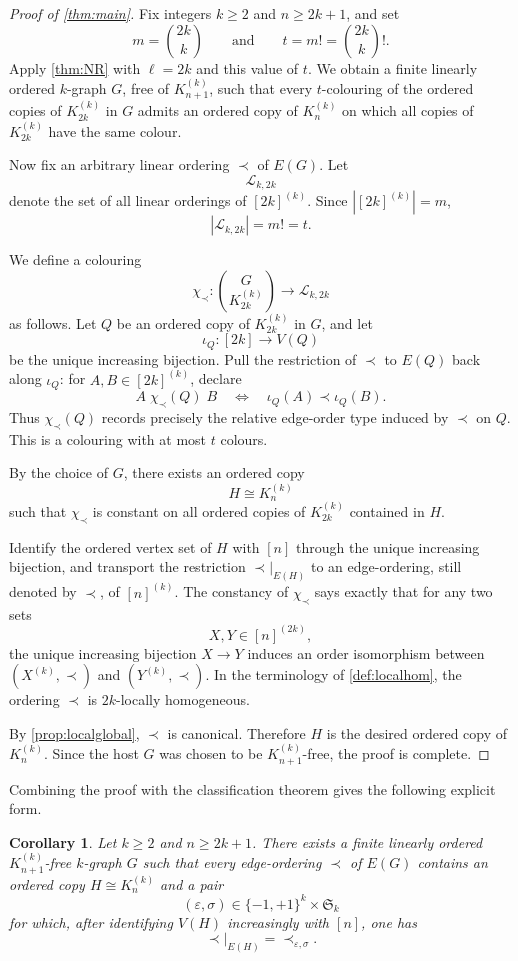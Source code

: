 \documentclass[11pt]{amsart}
\newtheorem{corollary}[theorem]{Corollary}
\theoremstyle{definition}
\newcommand{\eps}{\varepsilon}
\newcommand{\Sym}{\mathfrak{S}}
\begin{document}
\begin{proof}[Proof of \cref{thm:main}]
Fix integers $k\ge2$ and $n\ge2k+1$, and set
\[
m=\binom{2k}{k}
\qquad\text{and}\qquad
t=m!=\binom{2k}{k}!.
\]
Apply \cref{thm:NR} with $\ell=2k$ and this value of $t$. We obtain a finite linearly ordered $k$-graph $G$, free of $K_{n+1}^{(k)}$, such that every $t$-colouring of the ordered copies of $K_{2k}^{(k)}$ in $G$ admits an ordered copy of $K_n^{(k)}$ on which all copies of $K_{2k}^{(k)}$ have the same colour.

Now fix an arbitrary linear ordering $\prec$ of $E(G)$. Let
\[
\mathcal{L}_{k,2k}
\]
denote the set of all linear orderings of $[2k]^{(k)}$. Since $|[2k]^{(k)}|=m$,
\[
|\mathcal{L}_{k,2k}|=m!=t.
\]

We define a colouring
\[
\chi_{\prec}:\binom{G}{K_{2k}^{(k)}}\longrightarrow\mathcal{L}_{k,2k}
\]
as follows. Let $Q$ be an ordered copy of $K_{2k}^{(k)}$ in $G$, and let
\[
\iota_Q:[2k]\longrightarrow V(Q)
\]
be the unique increasing bijection. Pull the restriction of $\prec$ to $E(Q)$ back along $\iota_Q$: for $A,B\in[2k]^{(k)}$, declare
\[
A\;\chi_{\prec}(Q)\;B
\quad\Longleftrightarrow\quad
\iota_Q(A)\prec\iota_Q(B).
\]
Thus $\chi_{\prec}(Q)$ records precisely the relative edge-order type induced by $\prec$ on $Q$. This is a colouring with at most $t$ colours.

By the choice of $G$, there exists an ordered copy
\[
H\cong K_n^{(k)}
\]
such that $\chi_{\prec}$ is constant on all ordered copies of $K_{2k}^{(k)}$ contained in $H$.

Identify the ordered vertex set of $H$ with $[n]$ through the unique increasing bijection, and transport the restriction $\prec|_{E(H)}$ to an edge-ordering, still denoted by $\prec$, of $[n]^{(k)}$. The constancy of $\chi_{\prec}$ says exactly that for any two sets
\[
X,Y\in[n]^{(2k)},
\]
the unique increasing bijection $X\to Y$ induces an order isomorphism between $(X^{(k)},\prec)$ and $(Y^{(k)},\prec)$. In the terminology of \cref{def:localhom}, the ordering $\prec$ is $2k$-locally homogeneous.

By \cref{prop:localglobal}, $\prec$ is canonical. Therefore $H$ is the desired ordered copy of $K_n^{(k)}$. Since the host $G$ was chosen to be $K_{n+1}^{(k)}$-free, the proof is complete.
\end{proof}

Combining the proof with the classification theorem gives the following explicit form.

\begin{corollary}\label{cor:explicit}
Let $k\ge2$ and $n\ge2k+1$. There exists a finite linearly ordered $K_{n+1}^{(k)}$-free $k$-graph $G$ such that every edge-ordering $\prec$ of $E(G)$ contains an ordered copy $H\cong K_n^{(k)}$ and a pair
\[
(\eps,\sigma)\in\{-1,+1\}^k\times\Sym_k
\]
for which, after identifying $V(H)$ increasingly with $[n]$, one has
\[
\prec|_{E(H)}=\prec_{\eps,\sigma}.
\]
\end{corollary}
\end{document}
